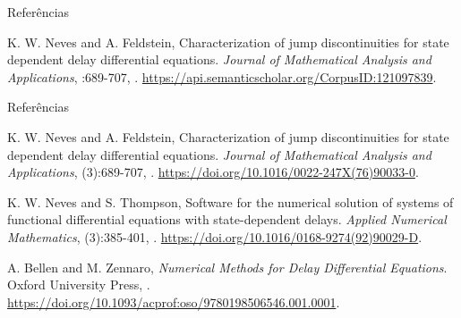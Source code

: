 \documentclass{beamer}
\theoremstyle{plain}
\theoremstyle{definition}
\begin{document}

\begin{frame}{Referências}


\begin{thebibliography}{2}



\beamertemplatearticlebibitems
{}
K. W. Neves and A. Feldstein,
\newblock Characterization of jump discontinuities for state dependent delay differential equations.
\newblock \emph{Journal of Mathematical Analysis and Applications},
:689-707,
.
\newblock \url{https://api.semanticscholar.org/CorpusID:121097839}.

 
\end{thebibliography}
\end{frame}



\begin{frame}{Referências}


\begin{thebibliography}{2}


\beamertemplatearticlebibitems
{}
K. W. Neves and A. Feldstein,
\newblock Characterization of jump discontinuities for state dependent delay differential equations.
\newblock \emph{Journal of Mathematical Analysis and Applications},
(3):689-707,
.
\newblock \url{https://doi.org/10.1016/0022-247X(76)90033-0}.

\beamertemplatearticlebibitems
{}
K. W. Neves and S. Thompson,
\newblock Software for the numerical solution of systems of functional differential equations with state-dependent delays.
\newblock \emph{Applied Numerical Mathematics},
(3):385-401,
.
\newblock \url{https://doi.org/10.1016/0168-9274(92)90029-D}.
 


\beamertemplatebookbibitems
{}
A. Bellen and M. Zennaro,
\newblock \emph{Numerical Methods for Delay Differential Equations}.
\newblock Oxford University Press,
.
\newblock \url{https://doi.org/10.1093/acprof:oso/9780198506546.001.0001}.
 
\end{thebibliography}
\end{frame}
\end{document}
